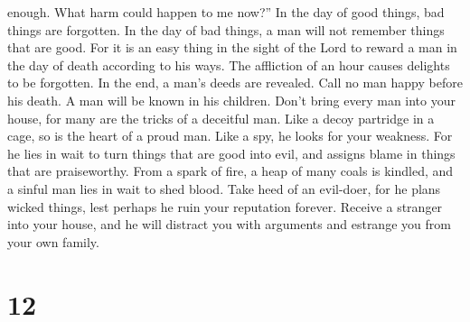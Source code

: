 enough. What harm could happen to me now?''  In the day of
good things, bad things are forgotten. In the day of bad things, a man
will not remember things that are good.  For it is an easy
thing in the sight of the Lord to reward a man in the day of death
according to his ways.  The affliction of an hour causes
delights to be forgotten. In the end, a man's deeds are revealed.
 Call no man happy before his death. A man will be known in
his children.  Don't bring every man into your house, for
many are the tricks of a deceitful man.  Like a decoy
partridge in a cage, so is the heart of a proud man. Like a spy, he
looks for your weakness.  For he lies in wait to turn
things that are good into evil, and assigns blame in things that are
praiseworthy.  From a spark of fire, a heap of many coals
is kindled, and a sinful man lies in wait to shed blood. 
Take heed of an evil-doer, for he plans wicked things, lest perhaps he
ruin your reputation forever.  Receive a stranger into your
house, and he will distract you with arguments and estrange you from
your own family.

\hypertarget{section-9}{%
\section{12}\label{section-9}}

